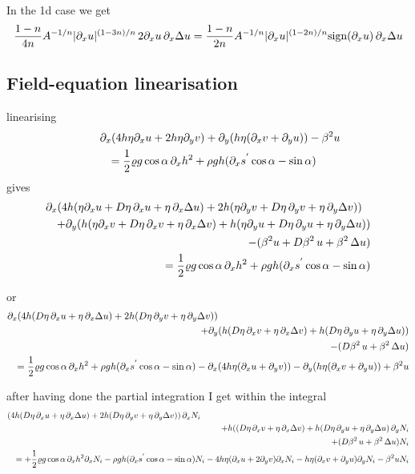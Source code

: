 \documentclass[10pt,a4paper]{book}
\newcommand{\p}{\partial}
\begin{document}
In the 1d case we get
\[
\frac{1-n}{4n} A^{-1/n}  |\p_x u |^{(1-3n)/n} \, 2 \p_x u  \, \p_x \Delta u
=\frac{1-n}{2n} A^{-1/n} |\p_x u |^{(1-2n)/n}  \hbox{sign}(\p_x u ) \, \p_x \Delta u
\]

\subsection{Field-equation linearisation}


linearising
\begin{eqnarray*}
\lefteqn{\p_x ( 4 h \eta \p_x u + 2 h \eta \p_y v) + \p_y ( h \eta (\p_x v + \p_y u)) - \beta^2 u } \\
& & = \frac{1}{2} \varrho g  \cos \alpha \, \p_x h^2 + \rho g h (\p_x s^{'} \cos \alpha  -  \sin \alpha )
\end{eqnarray*}
gives
\begin{eqnarray*}
\lefteqn{\p_x ( 4 h (\eta \p_x u+ D\eta \, \p_x u+ \eta \, \p_x \Delta u) + 2 h (\eta \p_y v +D\eta\, \p_y v + \eta \, \p_y \Delta v))} \\
& & +  \p_y ( h (\eta \p_x v + D\eta\, \p_x v + \eta \, \p_x \Delta v)  + h (\eta \p_y u + D\eta \, \p_y u + \eta \, \p_y \Delta u ))\\
& & - (\beta^2 u + D \beta^2\, u + \beta^2 \, \Delta u) \\
& & = \frac{1}{2} \varrho g  \cos \alpha \, \p_x h^2 + \rho g h (\p_x s^{'} \cos \alpha  -  \sin \alpha )
\end{eqnarray*}

or
\begin{eqnarray*}
\lefteqn{\p_x(4 h ( D\eta \, \p_x u+ \eta \, \p_x \Delta u) + 2 h (D\eta\, \p_y v + \eta \, \p_y \Delta v))} \\
& & +  \p_y ( h ( D\eta\, \p_x v + \eta \, \p_x \Delta v)  + h ( D\eta \, \p_y u + \eta \, \p_y \Delta u ))\\
& & - ( D \beta^2\, u + \beta^2 \, \Delta u) \\
& & = \frac{1}{2} \varrho g  \cos \alpha \, \p_x h^2 + \rho g h (\p_x s^{'} \cos \alpha  -  \sin \alpha )
-\p_x ( 4 h \eta (\p_x u+  \p_y v))-\p_y (h \eta (\p_x v + \p_y u)) + \beta^2 u
\end{eqnarray*}

after having done the partial integration  I get within the integral
\begin{eqnarray}
\lefteqn{(4 h ( D\eta \, \p_x u+ \eta \, \p_x \Delta u) + 2 h (D\eta\, \p_y v + \eta \, \p_y \Delta v) )\, \p_x N_i} \\
& & +  h (( D\eta\, \p_x v + \eta \, \p_x \Delta v)  + h ( D\eta \, \p_y u + \eta \, \p_y \Delta u ) \, \p_y N_i \nonumber \\
& &  +( D \beta^2\, u + \beta^2 \, \Delta u) N_i \nonumber \\
& & = +\frac{1}{2} \varrho g  \cos \alpha \, \p_x h^2 \p_x N_i- \rho g h (\p_x s^{'} \cos \alpha  -  \sin \alpha ) N_i
- 4 h \eta (\p_x u+ 2 \p_y v) \p_x N_i - h \eta (\p_x v + \p_y u) \p_y N_i- \beta^2 u N_i
\label{eq:4hDe}
\end{eqnarray}
\end{document}
